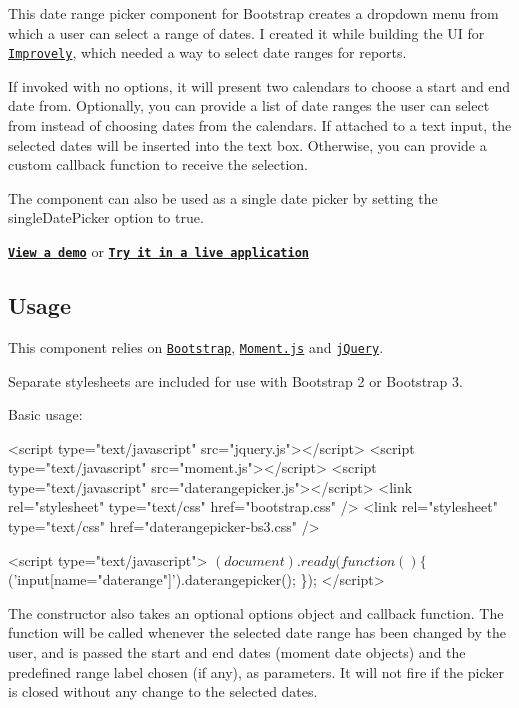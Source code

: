 

This date range picker component for Bootstrap creates a dropdown menu from which a user can select a range of dates. I created it while building the UI for \href{http://www.improvely.com}{\tt Improvely}, which needed a way to select date ranges for reports.

If invoked with no options, it will present two calendars to choose a start and end date from. Optionally, you can provide a list of date ranges the user can select from instead of choosing dates from the calendars. If attached to a text input, the selected dates will be inserted into the text box. Otherwise, you can provide a custom callback function to receive the selection.

The component can also be used as a single date picker by setting the {\ttfamily single\+Date\+Picker} option to {\ttfamily true}.

{\bfseries \href{http://www.dangrossman.info/2012/08/20/a-date-range-picker-for-twitter-bootstrap/}{\tt View a demo}} or {\bfseries \href{https://awio.iljmp.com/5/drpdemogh}{\tt Try it in a live application}}

\subsection*{Usage}

This component relies on \href{http://getbootstrap.com}{\tt Bootstrap}, \href{http://momentjs.com/}{\tt Moment.\+js} and \href{http://jquery.com/}{\tt j\+Query}.

Separate stylesheets are included for use with Bootstrap 2 or Bootstrap 3.

Basic usage\+:


\begin{DoxyCode}
<script type="text/javascript" src="jquery.js"></script>
<script type="text/javascript" src="moment.js"></script>
<script type="text/javascript" src="daterangepicker.js"></script>
<link rel="stylesheet" type="text/css" href="bootstrap.css" />
<link rel="stylesheet" type="text/css" href="daterangepicker-bs3.css" />

<script type="text/javascript">
$(document).ready(function() \{
  $('input[name="daterange"]').daterangepicker();
\});
</script>
\end{DoxyCode}


The constructor also takes an optional options object and callback function. The function will be called whenever the selected date range has been changed by the user, and is passed the start and end dates (moment date objects) and the predefined range label chosen (if any), as parameters. It will not fire if the picker is closed without any change to the selected dates.


